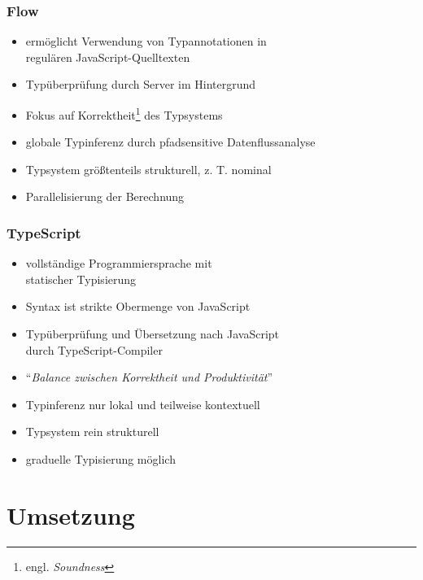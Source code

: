     \begin{frame}
      \frametitle{Flow}
      \begin{itemize}
        \item ermöglicht Verwendung von Typannotationen in\\regulären JavaScript-Quelltexten
        \item Typüberprüfung durch Server im Hintergrund
        \item Fokus auf Korrektheit\footnote{engl. \textit{Soundness}} des Typsystems
        \item globale Typinferenz durch pfadsensitive Datenflussanalyse
        \item Typsystem größtenteils strukturell, z. T. nominal
        \item Parallelisierung der Berechnung
      \end{itemize}
    \end{frame}

    \begin{frame}
      \frametitle{TypeScript}
      \begin{itemize}
        \item vollständige Programmiersprache mit\\statischer Typisierung
        \item Syntax ist strikte Obermenge von JavaScript
        \item Typüberprüfung und Übersetzung nach JavaScript\\durch TypeScript-Compiler
        \item \enquote{\textit{Balance zwischen Korrektheit und Produktivität}}~\autocite{TYPESCRIPT:DESIGN_GOALS}
        \item Typinferenz nur lokal und teilweise kontextuell
        \item Typsystem rein strukturell
        \item graduelle Typisierung möglich
      \end{itemize}
    \end{frame}

  \section{Umsetzung}

